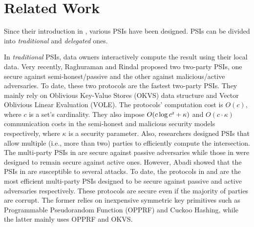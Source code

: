 
\section{Related Work}\label{sec::related-work}


Since their introduction in \cite{DBLP:conf/eurocrypt/FreedmanNP04}, various PSIs have been designed. PSIs can be divided into \textit{traditional} and \textit{delegated} ones.  


In \textit{traditional} PSIs, data owners interactively compute the result using their local data. 
%
Very recently, Raghuraman and Rindal \cite{RaghuramanR22} proposed two two-party PSIs, one secure against semi-honest/passive and the other against malicious/active adversaries. To date, these two protocols are the fastest two-party PSIs. They mainly rely on  Oblivious Key-Value Stores (OKVS) data structure and Vector Oblivious Linear Evaluation (VOLE). The protocols' computation cost is $O(c)$, where $c$ is  a set's cardinality.  They also impose $O(c\log c^{\scriptscriptstyle 2}+\kappa)$ and $O(c\cdot \kappa)$ communication costs in the semi-honest and malicious security models respectively, 
where 
$\kappa$ is a security parameter.  
%
Also, researchers designed PSIs that  allow multiple (i.e., more than two) parties to efficiently compute the intersection. The multi-party PSIs in  \cite{DBLP:conf/scn/InbarOP18,DBLP:conf/ccs/KolesnikovMPRT17} are secure against  passive adversaries while those in \cite{Ben-EfraimNOP21,GhoshN19,ZhangLLJL19,DBLP:conf/ccs/KolesnikovMPRT17,NevoTY21} were designed to remain secure against  active ones. However, Abadi \et  \cite{AbadiMZ21} showed that the PSIs in  \cite{GhoshN19} are susceptible to several attacks.  To date, the  protocols  in   \cite{DBLP:conf/ccs/KolesnikovMPRT17} and  \cite{NevoTY21} are the most  efficient multi-party PSIs  designed to be  secure against passive and active  adversaries respectively. These protocols are secure even if  the majority of parties are corrupt.  
%
%
The former relies on inexpensive symmetric key primitives such as  Programmable Pseudorandom Function (OPPRF) and Cuckoo Hashing, while the latter mainly uses OPPRF and OKVS. 


